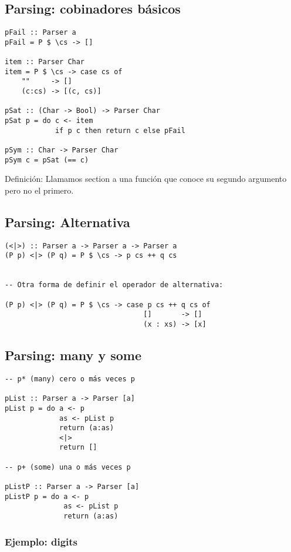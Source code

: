 \documentclass{article}
\newcommand{\imp}[1]{\textcolor{color1}{#1}}
\begin{document}
\subsection{Parsing: cobinadores básicos}

\begin{lstlisting}
pFail :: Parser a
pFail = P $ \cs -> []

item :: Parser Char
item = P $ \cs -> case cs of 
    ""     -> []
    (c:cs) -> [(c, cs)]

pSat :: (Char -> Bool) -> Parser Char
pSat p = do c <- item
            if p c then return c else pFail

pSym :: Char -> Parser Char
pSym c = pSat (== c)
\end{lstlisting}

\imp{Definición}: Llamamos \imp{section} a una función que conoce su segundo argumento pero no el primero.

\subsection{Parsing: Alternativa}

\begin{lstlisting}
(<|>) :: Parser a -> Parser a -> Parser a
(P p) <|> (P q) = P $ \cs -> p cs ++ q cs


-- Otra forma de definir el operador de alternativa:

(P p) <|> (P q) = P $ \cs -> case p cs ++ q cs of
                                 []       -> []
                                 (x : xs) -> [x]
\end{lstlisting}

\newpage

\subsection{Parsing: many y some}

\begin{lstlisting}
-- p* (many) cero o más veces p

pList :: Parser a -> Parser [a]
pList p = do a <- p
             as <- pList p
             return (a:as)
             <|>
             return []

-- p+ (some) una o más veces p

pListP :: Parser a -> Parser [a]
pListP p = do a <- p
              as <- pList p
              return (a:as)
\end{lstlisting}

\subsubsection{Ejemplo: digits}
\end{document}
